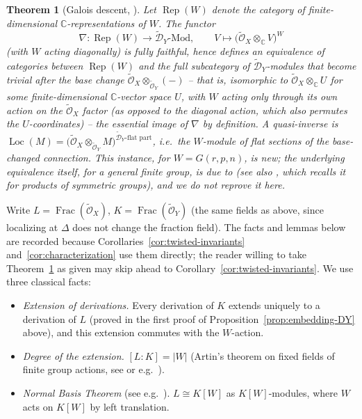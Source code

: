 \documentclass[11pt,a4paper]{article}
\newtheorem{theorem}{Theorem}[section]
\begin{document}
\begin{theorem}[Galois descent, {\cite[\S 2.4]{Nonkane2019}}]\label{thm:descent}
Let $\operatorname{Rep}(W)$ denote the category of finite-dimensional
$\mathbb{C}$-representations of $W$. The functor
\[
  \nabla : \operatorname{Rep}(W) \longrightarrow \widetilde{\mathcal{D}}_Y\text{-}\mathrm{Mod},
  \qquad V \longmapsto \big(\widetilde{\mathcal{O}}_X \otimes_{\mathbb{C}} V\big)^{W}
\]
(with $W$ acting diagonally) is fully faithful, hence defines an
equivalence of categories between $\operatorname{Rep}(W)$ and the full
subcategory of $\widetilde{\mathcal{D}}_Y$-modules that become trivial
after the base change
$\widetilde{\mathcal{O}}_X \otimes_{\widetilde{\mathcal{O}}_Y} (-)$ --
that is, isomorphic to $\widetilde{\mathcal{O}}_X \otimes_{\mathbb{C}} U$
for some finite-dimensional $\mathbb{C}$-vector space $U$, with $W$
acting only through its own action on the $\widetilde{\mathcal{O}}_X$
factor (as opposed to the diagonal action, which also permutes the
$U$-coordinates) -- the essential image of $\nabla$ by definition. A
quasi-inverse is
$\operatorname{Loc}(M) = \big(\widetilde{\mathcal{O}}_X \otimes_{\widetilde{\mathcal{O}}_Y} M\big)^{\widetilde{\mathcal{D}}_Y\text{-flat part}}$,
i.e.\ the $W$-module of flat sections of the base-changed connection.
This instance, for $W = G(r,p,n)$, is new; the underlying equivalence
itself, for a general finite group, is due to
\cite[\S 2.4]{Nonkane2019} (see also
\cite[Prop.\ 3.10]{NonkaneTodjihounde2023}, which recalls it for
products of symmetric groups), and we do not reprove it
here.
\end{theorem}

Write $L = \operatorname{Frac}(\widetilde{\mathcal{O}}_X)$,
$K = \operatorname{Frac}(\widetilde{\mathcal{O}}_Y)$ (the same fields
as above, since localizing at $\Delta$ does not change the fraction
field). The facts and lemmas below are recorded because
Corollaries~\ref{cor:twisted-invariants} and~\ref{cor:characterization}
use them directly; the reader willing to take
Theorem~\ref{thm:descent} as given may skip ahead to
Corollary~\ref{cor:twisted-invariants}. We
use three classical facts:

\begin{itemize}
  \item[(F1)] \emph{Extension of derivations.} Every derivation of $K$
    extends uniquely to a derivation of $L$ (proved in the first
    proof of Proposition~\ref{prop:embedding-DY} above), and this
    extension commutes with the $W$-action.
  \item[(F2)] \emph{Degree of the extension.} $[L:K] = |W|$ (Artin's
    theorem on fixed fields of finite group actions, see
    \cite{Artin1942} or e.g.\
    \cite[Chap.\ VI]{Lang2002}).
  \item[(F3)] \emph{Normal Basis Theorem} (see e.g.\ \cite[Chap.\ VI]{Lang2002}).
    $L \cong K[W]$ as $K[W]$-modules, where $W$ acts on $K[W]$ by left
    translation.
\end{itemize}
\end{document}
